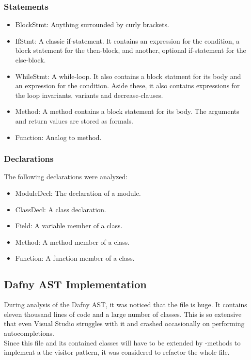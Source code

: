 \subsubsection{Statements}
\begin{itemize}
    \item BlockStmt: Anything surrounded by curly brackets.
    \item IfStmt: A classic if-statement. It contains an expression for the condition, a block statement for the then-block, and another, optional if-statement for the else-block.
    \item WhileStmt: A while-loop. It also contains a block statment for its body and an expression for the condition. Aside these, it also contains expressions for the loop invariants, variants and decrease-clauses.
    \item Method: A method contains a block statement for its body. The arguments and return values are stored as formals.
    \item Function: Analog to method.
\end{itemize}

\subsubsection{Declarations}
The following declarations were analyzed:
\begin{itemize}
    \item ModuleDecl: The declaration of a module.
    \item ClassDecl: A class declaration.
    \item Field: A variable member of a class.
    \item Method: A method member of a class.
    \item Function: A function member of a class.
\end{itemize}



\subsection{Dafny AST Implementation}
During analysis of the Dafny AST, it was noticed that the file  is huge.
It contains eleven thousand lines of code and a large number of classes.
This is so extensive that even Visual Studio struggles with it and crashed occasionally on performing autocompletions.\\

Since this file and its contained classes will have to be extended by -methods
to implement a the visitor pattern, it was considered to refactor the whole file.\\

